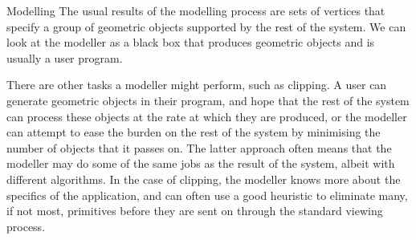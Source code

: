 \documentclass[../COS3712_Notes.tex]{subfiles}
\begin{document}
      \begin{definition}{Modelling}
        The usual results of the modelling process are sets of vertices that specify
        a group of geometric objects supported by the rest of the system.
        We can look at the modeller as a black box that produces geometric objects
        and is usually a user program.

        There are other tasks a modeller might perform, such as clipping.
        A user can generate geometric objects in their program,
        and hope that the rest of the system can process these objects at the rate at which
        they are produced, or the modeller can attempt to ease the burden on the rest of the
        system by minimising the number of objects that it passes on.
        The latter approach often means that the modeller may do some of the same jobs
        as the result of the system, albeit with different algorithms.
        In the case of clipping, the modeller knows more about the specifics of the application,
        and can often use a good heuristic to eliminate many, if not most,
        primitives before they are sent on through the standard viewing process.
      \end{definition}
\end{document}
